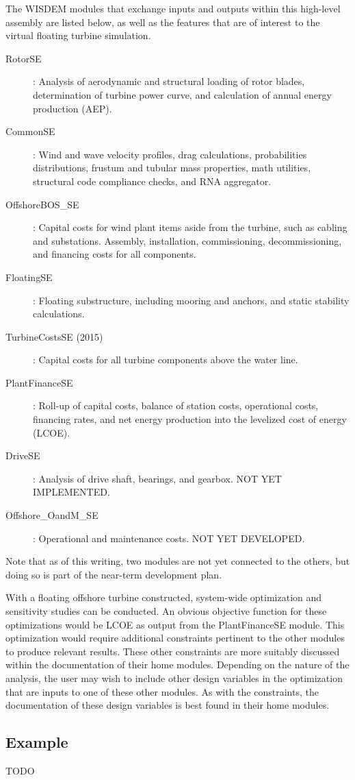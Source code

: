 The WISDEM modules that exchange inputs and outputs within this
high-level assembly are listed below, as well as the features that are
of interest to the virtual floating turbine simulation.
\begin{description}
\item[RotorSE]: Analysis of aerodynamic and structural loading of rotor
  blades, determination of turbine power curve, and calculation of
  annual energy production (AEP).
\item[CommonSE]: Wind and wave velocity profiles, drag calculations,
  probabilities distributions, frustum and tubular mass properties, math
  utilities, structural code compliance checks, and RNA aggregator.
\item[OffshoreBOS\_SE]: Capital costs for wind plant items aside from the
  turbine, such as cabling and substations.  Assembly, installation,
  commissioning, decommissioning, and financing costs for all components.
\item[FloatingSE]: Floating substructure, including mooring and anchors, and
  static stability calculations.
\item[TurbineCostsSE (2015)]: Capital costs for all turbine components
  above the water line.
\item[PlantFinanceSE]: Roll-up of capital costs, balance of station
  costs, operational costs, financing rates, and net energy production
  into the levelized cost of energy (LCOE).
\item[DriveSE]: Analysis of drive shaft, bearings, and gearbox.  NOT YET
  IMPLEMENTED.
\item[Offshore\_OandM\_SE]: Operational and maintenance costs.  NOT YET
    DEVELOPED.
\end{description}
Note that as of this writing, two modules are not yet connected to the
others, but doing so is part of the near-term development plan.

With a floating offshore turbine constructed, system-wide optimization
and sensitivity studies can be conducted.  An obvious objective function
for these optimizations would be LCOE as output from the PlantFinanceSE
module.  This optimization would require additional constraints
pertinent to the other modules to produce relevant results.  These other
constraints are more suitably discussed within the documentation of
their home modules.  Depending on the nature of the analysis, the user
may wish to include other design variables in the optimization that are
inputs to one of these other modules.  As with the constraints, the
documentation of these design variables is best found in their home
modules.

\subsection{Example}
TODO
